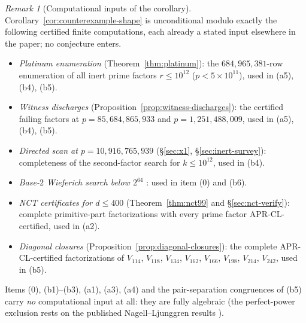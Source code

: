 \documentclass[11pt]{amsart}
\theoremstyle{plain}
\theoremstyle{definition}
\theoremstyle{remark}
\newtheorem{remark}[theorem]{Remark}
\numberwithin{equation}{section}
\begin{document}
\begin{remark}[Computational inputs of the corollary]\label{rem:shape-inputs}
Corollary~\ref{cor:counterexample-shape} is unconditional modulo exactly
the following certified finite computations, each already a stated input
elsewhere in the paper; no conjecture enters.
\begin{itemize}
\item \emph{Platinum enumeration} (Theorem~\ref{thm:platinum}): the
$684{,}965{,}381$-row enumeration of all inert prime factors
$r \leq 10^{12}$ ($p < 5 \times 10^{11}$), used in (a5), (b4), (b5).
\item \emph{Witness discharges}
(Proposition~\ref{prop:witness-discharges}): the certified failing
factors at $p = 85{,}684{,}865{,}933$ and $p = 1{,}251{,}488{,}009$,
used in (a5), (b4), (b5).
\item \emph{Directed scan at $p = 10{,}916{,}765{,}939$}
(\S\ref{sec:x1}, \S\ref{sec:inert-survey}): completeness of the
second-factor search for $k \leq 10^{12}$, used in (b4).
\item \emph{Base-$2$ Wieferich search below $2^{64}$}
\cite{ref:OEISWieferich}: used in item (0) and (b6).
\item \emph{NCT certificates for $d \leq 400$}
(Theorem~\ref{thm:nct99} and \S\ref{sec:nct-verify}): complete
primitive-part factorizations with every prime factor APR-CL-certified,
used in (a2).
\item \emph{Diagonal closures} (Proposition~\ref{prop:diagonal-closures}):
the complete APR-CL-certified factorizations of $V_{114}$, $V_{118}$,
$V_{134}$, $V_{162}$, $V_{166}$, $V_{198}$, $V_{214}$, $V_{242}$, used
in (b5).
\end{itemize}
Items (0), (b1)--(b3), (a1), (a3), (a4) and the pair-separation
congruences of (b5) carry \emph{no} computational input at all: they are
fully algebraic (the perfect-power exclusion rests on the published
Nagell--Ljunggren results \cite{ref:BennettLevin,
ref:BugeaudMignotte2002, ref:BugeaudCaoMignotte2001}).
\end{remark}
\end{document}
